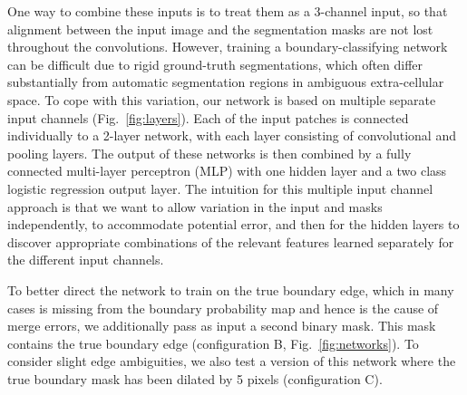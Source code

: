 One way to combine these inputs is to treat them as a 3-channel input, so that alignment between the input image and the segmentation masks are not lost throughout the convolutions. However, training a boundary-classifying network can be difficult due to rigid ground-truth segmentations, which often differ substantially from automatic segmentation regions in ambiguous extra-cellular space. To cope with this variation, our network is based on multiple separate input channels (Fig.~\ref{fig:layers}). Each of the input patches is connected individually to a 2-layer network, with each layer consisting of convolutional and pooling layers. The output of these networks is then combined by a fully connected multi-layer perceptron (MLP) with one hidden layer and a two class logistic regression output layer. The intuition for this multiple input channel approach is that we want to allow variation in the input and masks independently, to accommodate potential error, and then for the hidden layers to discover appropriate combinations of the relevant features learned separately for the different input channels.

To better direct the network to train on the true boundary edge, which in many cases is missing from the boundary probability map and hence is the cause of merge errors, we additionally pass as input a second binary mask. This mask contains the true boundary edge (configuration B, Fig.~\ref{fig:networks}). To consider slight edge ambiguities, we also test a version of this network where the true boundary mask has been dilated by 5 pixels (configuration C).



%  


